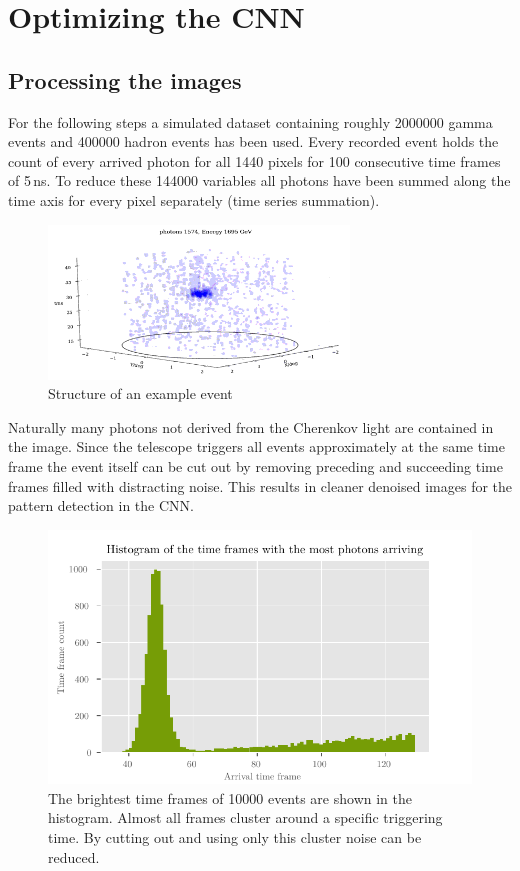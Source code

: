 \chapter{Optimizing the CNN}\label{make}

\section{Processing the images}
For the following steps a simulated dataset containing roughly \num{2000000} gamma events and \num{400000} hadron events has been used.
Every recorded event holds the count of every arrived photon for all \num{1440} pixels for \num{100} consecutive time frames of \num{5}\,\si{\nano\second}.
To reduce these \num{144000} variables all photons have been summed along the time axis for every pixel separately (time series summation).

\begin{figure}
    \centering
    \includegraphics[width=8cm]{Plots/Photon_Event_3D.png}
    \caption{Structure of an example event}
    \label{fig:example_event}
\end{figure}

Naturally many photons not derived from the Cherenkov light are contained in the image.
Since the telescope triggers all events approximately at the same time frame
the event itself can be cut out by removing preceding and succeeding time frames filled with distracting noise.
This results in cleaner denoised images for the pattern detection in the CNN.

\begin{figure}
    \centering
    \includegraphics[scale=1]{Plots/Arrivaltimes.pdf}
    \caption{The brightest time frames of \num{10000} events are shown in the histogram. Almost all frames cluster around a specific triggering time. By cutting out and using only this cluster noise can be reduced.}
    \label{fig:arrivaltimes}
\end{figure}

